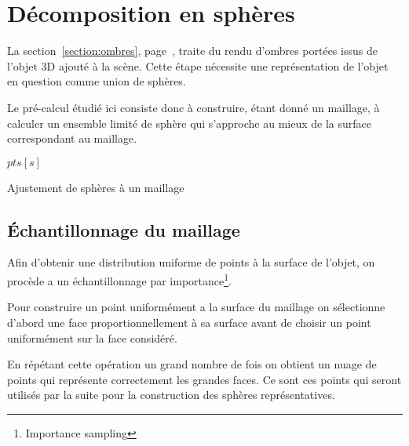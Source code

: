 \documentclass[10pt,a4paper,twoside, twocolumn]{report}
\begin{document}
\section{Décomposition en sphères}
La section~\ref{section:ombres}, page~\pageref{section:ombres}, traite du rendu d'ombres portées issus de l'objet 3D ajouté à la scène. Cette étape nécessite une représentation de l'objet en question comme union de sphères.

Le pré-calcul étudié ici consiste donc à construire, étant donné un maillage, à calculer un ensemble limité de sphère qui s'approche au mieux de la surface correspondant au maillage.



\begin{algorithm}[ht]

	\BlankLine
	\Point $pts[s]$\;
	\BlankLine
	\BlankLine
	\;
	\caption{Ajustement de sphères à un maillage}
\end{algorithm}



\subsection{Échantillonnage du maillage}

Afin d'obtenir une distribution uniforme de points à la surface de l'objet, on procède a un échantillonnage par importance\footnote{Importance sampling}.

Pour construire un point uniformément a la surface du maillage on sélectionne d'abord une face proportionnellement à sa surface avant de choisir un point uniformément sur la face considéré.

En répétant cette opération un grand nombre de fois on obtient un nuage de points qui représente correctement les grandes faces. Ce sont ces points qui seront utilisés par la suite pour la construction des sphères représentatives.
\end{document}
